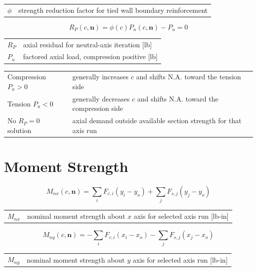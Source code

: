 \documentclass[10pt]{article}
\begin{document}
{\ttfamily\footnotesize
\begin{tabular}{@{}ll@{}}
$\phi$ & strength reduction factor for tied wall boundary reinforcement \\
\end{tabular}
}

\begin{equation}
R_P(c,\mathbf n)=\phi(c)P_n(c,\mathbf n)-P_u=0
\end{equation}

{\ttfamily\footnotesize
\begin{tabular}{@{}ll@{}}
$R_P$ & axial residual for neutral-axis iteration [lb] \\
$P_u$ & factored axial load, compression positive [lb] \\
\end{tabular}
}


{\ttfamily\footnotesize
\begin{tabular}{@{}p{1.8in}p{4.9in}@{}}
Compression $P_u>0$ & generally increases $c$ and shifts N.A. toward the tension side \\
Tension $P_u<0$ & generally decreases $c$ and shifts N.A. toward the compression side \\
No $R_P=0$ solution & axial demand outside available section strength for that axis run \\
\end{tabular}
}

\section{Moment Strength}

\begin{equation}
M_{nx}(c,\mathbf n) =
\sum_i F_{c,i}(y_i-y_o)+\sum_j F_{s,j}(y_j-y_o)
\end{equation}

{\ttfamily\footnotesize
\begin{tabular}{@{}ll@{}}
$M_{nx}$ & nominal moment strength about $x$ axis for selected axis run [lb-in] \\
\end{tabular}
}

\begin{equation}
M_{ny}(c,\mathbf n) =
-\sum_i F_{c,i}(x_i-x_o)-\sum_j F_{s,j}(x_j-x_o)
\end{equation}

{\ttfamily\footnotesize
\begin{tabular}{@{}ll@{}}
$M_{ny}$ & nominal moment strength about $y$ axis for selected axis run [lb-in] \\
\end{tabular}
}
\end{document}
